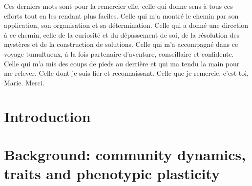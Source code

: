 \documentclass[a4paper, notoc, justified,marginals=left, nobib]{tufte-book}
\begin{document}
\begin{fullwidth}
\vspace{0.5cm}

Ces derniers mots sont pour la remercier elle, celle qui donne sens à tous ces efforts tout en les rendant plus faciles. Celle qui m'a montré le chemin par son application, son organisation et sa détermination. Celle qui a donné une direction à ce chemin, celle de la curiosité et du dépassement de soi, de la résolution des mystères et de la construction de solutions. Celle qui m'a accompagné dans ce voyage tumultueux, à la fois partenaire d'aventure, conseillaire et confidente. Celle qui m'a mis des coups de pieds au derrière et qui ma tendu la main pour me relever. Celle dont je suis fier et reconnaissant. Celle que je remercie, c'est toi, Marie. Merci.

\cleardoublepage

\tableofcontents

\newpage




\end{fullwidth}
\cleardoublepage



\part{Introduction}\label{part:introduction}
\begin{refsection}


\begin{fullwidth}
\printbibliography[heading=bibliography] 
\end{fullwidth}
\end{refsection}

\part[Background: community dynamics, traits and phenotypic plasticity]{Background: community dynamics,\\traits and phenotypic plasticity}\label{part:literature}
\begin{refsection}
\setcounter{chapter}{0}



\begin{fullwidth}
\printbibliography[heading=bibliography] 
\end{fullwidth}
\end{refsection}
\end{document}
